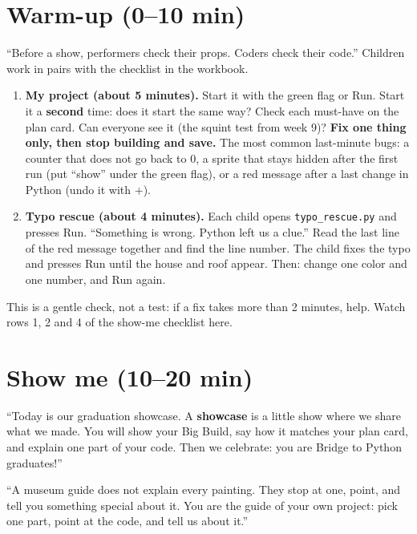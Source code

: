 \section{Warm-up (0--10 min)}
\begin{bughunt}
\enquote{Before a show, performers check their props. Coders check their code.} Children work in pairs with the checklist in the workbook.
\begin{enumerate}[leftmargin=1.4em,itemsep=1pt]
  \item \textbf{My project (about 5 minutes).} Start it with the green flag or Run. Start it a \textbf{second} time: does it start the same way? Check each must-have on the plan card. Can everyone see it (the squint test from week 9)? \textbf{Fix one thing only, then stop building and save.} The most common last-minute bugs: a counter that does not go back to 0, a sprite that stays hidden after the first run (put \enquote{show} under the green flag), or a red message after a last change in Python (undo it with +).
  \item \textbf{Typo rescue (about 4 minutes).} Each child opens \texttt{typo\_rescue.py} and presses Run. \enquote{Something is wrong. Python left us a clue.} Read the last line of the red message together and find the line number. The child fixes the typo and presses Run until the house and roof appear. Then: change one color and one number, and Run again.
\end{enumerate}
This is a gentle check, not a test: if a fix takes more than 2 minutes, help. Watch rows 1, 2 and 4 of the show-me checklist here.
\end{bughunt}

\section{Show me (10--20 min)}
\begin{teacherscript}
\enquote{Today is our graduation showcase. A \textbf{showcase} is a little show where we share what we made. You will show your Big Build, say how it matches your plan card, and explain one part of your code. Then we celebrate: you are Bridge to Python graduates!}
\end{teacherscript}

\begin{analogy}
\enquote{A museum guide does not explain every painting. They stop at one, point, and tell you something special about it. You are the guide of your own project: pick one part, point at the code, and tell us about it.}
\end{analogy}

